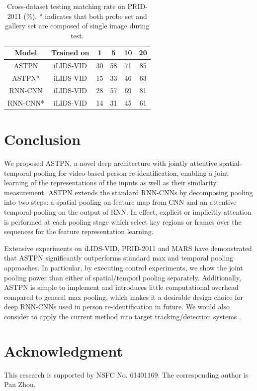 \documentclass[10pt,twocolumn,letterpaper]{article}
\begin{document}
 
 \begin{table}[tp]
 \small
 \renewcommand{\arraystretch}{1.3}
 \caption{Cross-dataset testing matching rate on PRID-2011 (\%). * indicates that both probe set and gallery set are composed of single image during test.}
 \label{table_Cross}
 \centering
 \begin{tabular}{|c|c|c|c|c|c|}
 \hline
 Model & Trained on & 1 & 5 & 10 & 20\\
 \hline
 \hline
 ASTPN &      iLIDS-VID      &  30  & 58  &  71  &  85  \\
 \hline
 ASTPN* &       iLIDS-VID     &  15  & 33  &  46  &  63  \\
 \hline
 RNN-CNN &    iLIDS-VID    &    28 &  57  &  69 &  81     \\
 \hline
 RNN-CNN* &     iLIDS-VID    &   14 &  31  & 45  &  61     \\
 \hline
 
 \end{tabular}           
 
 
 \end{table}

   
 

 
 
 
 
\section{Conclusion}
We proposed ASTPN, a novel deep architecture with jointly attentive spatial-temporal pooling for video-based person re-identification, enabling a joint learning of the representations of the inputs as well
as their similarity measurement. ASTPN extends the standard RNN-CNNs by decomposing pooling into two steps: a spatial-pooling on feature map from CNN and an attentive temporal-pooling on the output of RNN. In effect, explicit or implicitly attention is performed at each pooling stage which 
select key regions or frames over the sequences for the feature representation learning. 

Extensive experiments on iLIDS-VID, PRID-2011 and MARS have demonstrated that ASTPN significantly outperforms standard max and temporal pooling approaches. In particular, by executing control experiments, we show the joint pooling power than either of spatial/temporl pooling separately. Additionally, ASTPN is simple to implement and introduces little computational overhead compared to general max pooling, which makes
it a desirable design choice for deep RNN-CNNs used in person re-identification in future. We would also consider to apply the current method into target tracking/detection systems \cite{Wang_2016_CVPR}. 

\section{Acknowledgment}
This research is supported by NSFC No. 61401169. The corresponding author is Pan Zhou.

{\small


}
\end{document}
